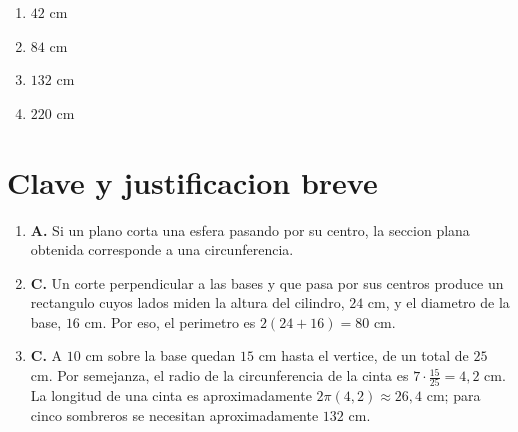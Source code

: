 \documentclass[12pt]{article}
\begin{document}
\begin{enumerate}[label=\textbf{\arabic*.}, itemsep=1.05cm]
\begin{center}
\end{center}

\begin{enumerate}[label=\Alph*)]
  \item $42$ cm
  \item $84$ cm
  \item $132$ cm
  \item $220$ cm
\end{enumerate}

\end{enumerate}

\section*{Clave y justificacion breve}

\begin{enumerate}[label=\textbf{\arabic*.}]
  \item \textbf{A.} Si un plano corta una esfera pasando por su centro, la seccion plana obtenida corresponde a una circunferencia.
  \item \textbf{C.} Un corte perpendicular a las bases y que pasa por sus centros produce un rectangulo cuyos lados miden la altura del cilindro, $24$ cm, y el diametro de la base, $16$ cm. Por eso, el perimetro es $2(24+16)=80$ cm.
  \item \textbf{C.} A $10$ cm sobre la base quedan $15$ cm hasta el vertice, de un total de $25$ cm. Por semejanza, el radio de la circunferencia de la cinta es $7\cdot\frac{15}{25}=4,2$ cm. La longitud de una cinta es aproximadamente $2\pi(4,2)\approx 26,4$ cm; para cinco sombreros se necesitan aproximadamente $132$ cm.
\end{enumerate}
\end{document}
